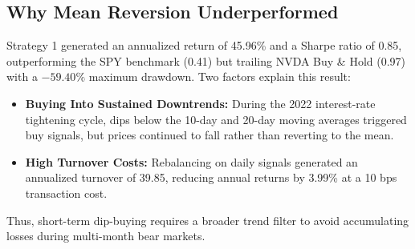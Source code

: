 \documentclass[11pt, a4paper]{article}
\begin{document}
\subsection{Why Mean Reversion Underperformed}
Strategy 1 generated an annualized return of 45.96\% and a Sharpe ratio of 0.85, outperforming the SPY benchmark (0.41) but trailing NVDA Buy \& Hold (0.97) with a $-59.40\%$ maximum drawdown. Two factors explain this result:
\begin{itemize}
    \item \textbf{Buying Into Sustained Downtrends:} During the 2022 interest-rate tightening cycle, dips below the 10-day and 20-day moving averages triggered buy signals, but prices continued to fall rather than reverting to the mean.
    \item \textbf{High Turnover Costs:} Rebalancing on daily signals generated an annualized turnover of 39.85, reducing annual returns by 3.99\% at a 10 bps transaction cost.
\end{itemize}
Thus, short-term dip-buying requires a broader trend filter to avoid accumulating losses during multi-month bear markets.
\end{document}
